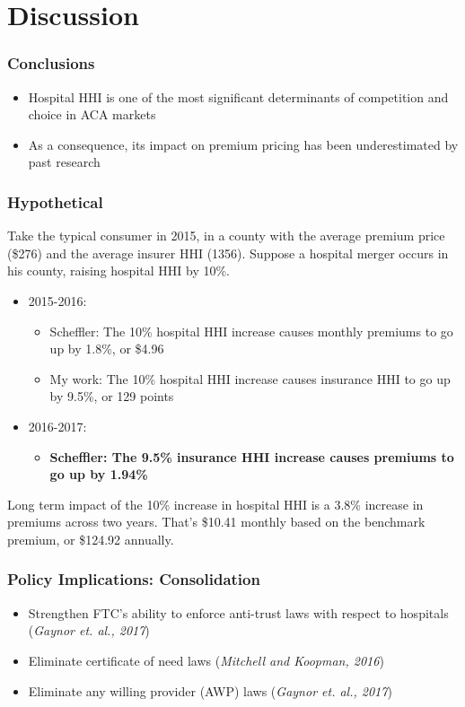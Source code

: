 \documentclass{beamer}
\begin{document}
\section[Discussion]{Discussion}

\begin{frame}
\frametitle{Conclusions}
\begin{itemize}
\item Hospital HHI is one of the most significant determinants of competition and choice in ACA markets
\item As a consequence, its impact on premium pricing has been underestimated by past research
\end{itemize}
\end{frame}

\begin{frame}
\frametitle{Hypothetical}
Take the typical consumer in 2015, in a county with the average premium price (\$276) and the average insurer HHI (1356). Suppose a hospital merger occurs in his county, raising hospital HHI by 10\%. 
\begin{itemize}
\item 2015-2016:
\begin{itemize}
\item Scheffler: The 10\% hospital HHI increase causes monthly premiums to go up by 1.8\%, or \$4.96
\item My work: The 10\% hospital HHI increase causes insurance HHI to go up by 9.5\%, or 129 points
\end{itemize}
\item 2016-2017:
\begin{itemize}
\item \textbf{Scheffler: The 9.5\% insurance HHI increase causes premiums to go up by 1.94\%}
\end{itemize}
\end{itemize}
Long term impact of the 10\% increase in hospital HHI is a 3.8\% increase in premiums across two years. That's \$10.41 monthly based on the benchmark premium, or \$124.92 annually.
\end{frame}


\begin{frame}
\frametitle{Policy Implications: Consolidation}
\begin{itemize}
\item Strengthen FTC's ability to enforce anti-trust laws with respect to hospitals (\textit{Gaynor et. al., 2017})
\item Eliminate certificate of need laws (\textit{Mitchell and Koopman, 2016})
\item Eliminate any willing provider (AWP) laws (\textit{Gaynor et. al., 2017})
\end{itemize}
\end{frame}
\end{document}
